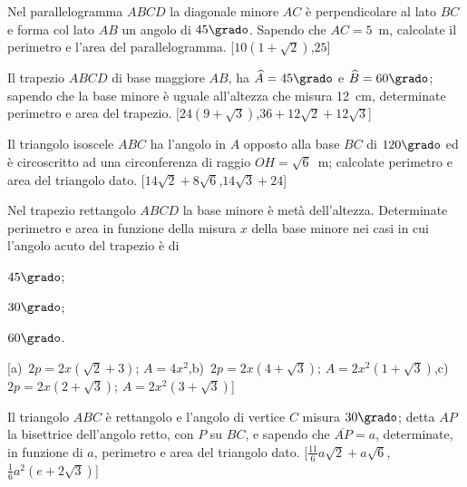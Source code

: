 \begin{multicols}{2}
\begin{esercizio}
\label{ese:7.27}
Nel parallelogramma \(ABCD\) la diagonale minore \(AC\) è perpendicolare 
al lato \(BC\) e forma col lato \(AB\) un angolo di \(45\grado\). Sapendo 
che \(AC=5\)~m, calcolate il perimetro e l'area del parallelogramma.
\hfill[\(10(1+\sqrt{2})\),\quad \(25\)]
\end{esercizio}

\begin{esercizio}
\label{ese:7.28}
Il trapezio \(ABCD\) di base maggiore \(AB\), ha \(\widehat{A}=45\grado\) e 
\(\widehat{B}=60\grado\); sapendo che la base minore è uguale 
all'altezza che misura 12~cm, determinate perimetro e area del 
trapezio.
\hfill[\(24(9+\sqrt{3})\),\quad \(36+12\sqrt{2}+12\sqrt{3}\)]
\end{esercizio}

\begin{esercizio}
\label{ese:7.30}
Il triangolo isoscele \(ABC\) ha l'angolo in \(A\) opposto alla base \(BC\) 
di \(120\grado\) ed è circoscritto ad una circonferenza di raggio 
\(OH=\sqrt{6}\)~m; calcolate perimetro e area del triangolo dato.
\hfill[\(14\sqrt{2}+8\sqrt{6}\),\quad \(14\sqrt{3}+24\)]
\end{esercizio}

\begin{esercizio}
\label{ese:7.32}
Nel trapezio rettangolo \(ABCD\) la base minore è metà dell'altezza. 
Determinate perimetro e area in funzione della misura \(x\) della base 
minore nei casi in cui l'angolo acuto del trapezio è di
\begin{enumeratea}
\item \(45\grado\);
\item \(30\grado\);
\item \(60\grado\).
\end{enumeratea}
\hfill[a)~\(2p=2x(\sqrt{2}+3)\); \(A=4x^2\),\quad b)~\(2p=2x(4+\sqrt{3})\); 
\(A=2x^2(1+\sqrt{3})\),\quad c)~\(2p=2x(2+\sqrt{3})\); 
\(A=2x^2(3+\sqrt{3})\)]
\end{esercizio}

\begin{esercizio}
\label{ese:7.33}
Il triangolo \(ABC\) è rettangolo e l'angolo di vertice \(C\) misura 
\(30\grado\); detta \(AP\) la bisettrice dell'angolo retto, con \(P\) su 
\(BC\), e sapendo che \(\overline{AP}=a\), determinate, in funzione di 
\(a\), perimetro e area del triangolo dato.
\hfill[\(\frac{11}{6}a\sqrt{2}+a\sqrt{6}\),\quad \(\frac{1}{6}a^2(e+2\sqrt{3})\)]
\end{esercizio}


\end{multicols}

